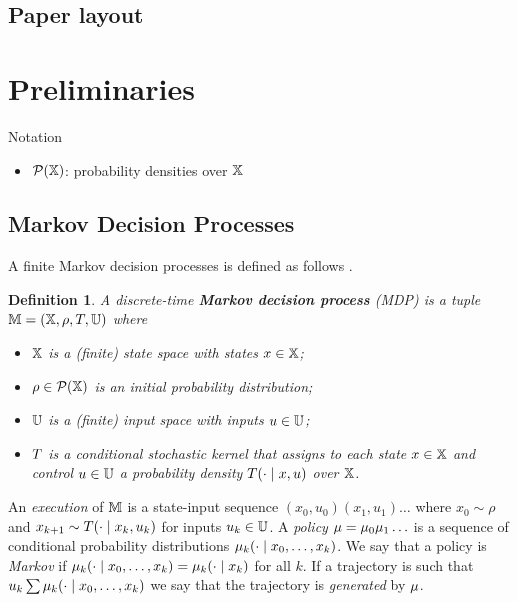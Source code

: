 \documentclass[conference]{IEEEtran}
\newtheorem{definition}{Definition}
\begin{document}
\subsection{Paper layout}

\section{Preliminaries}

Notation

\begin{itemize}
  \item $\mathcal P(\mathbb{X})$: probability densities over $\mathbb{X}$
\end{itemize}

\subsection{Markov Decision Processes}

A finite Markov decision processes is defined as follows \cite{hll1996}.
\begin{definition}
\label{def:MDP}
  A discrete-time \textbf{Markov decision process} (MDP) is a tuple $\mathbb{M} = (\mathbb{X}, \rho, T, \mathbb{U})$ where
  \begin{itemize}
    \item $\mathbb{X}$ is a (finite) state space with states $x\in\mathbb{X}$; %
    \item $\rho \in \mathcal P(\mathbb{X})$ is an initial probability distribution;
    \item $\mathbb{U}$ is a (finite) input space with inputs $u\in\mathbb{U}$;
    \item $T$ is a conditional stochastic kernel that assigns to each state $x\in \mathbb{X}$ and control $u\in \mathbb{U}$ a probability density $T(\cdot\mid x,u)$ over $\mathbb{X}$.
  \end{itemize}
\end{definition}

An \emph{execution} of $\mathbb{M}$ is a state-input sequence $(x_0, u_0)(x_1, u_1)\ldots$ where $x_0 \sim \rho$ and $x_{k+1} \sim T(\cdot \mid x_k, u_k)$ for inputs $u_k \in \mathbb{U}$. A \emph{policy} $\mu = \mu_0 \mu_1 \ldots$ is a sequence of conditional probability distributions $\mu_k( \cdot \mid x_0, \ldots, x_{k})$. We say that a policy is \emph{Markov} if $\mu_k( \cdot \mid x_0, \ldots, x_{k}) = \mu_k( \cdot \mid x_{k})$ for all $k$. If a trajectory is such that $u_k \sum \mu_k ( \cdot \mid x_0, \ldots, x_{k})$ we say that the trajectory is \emph{generated} by $\mu$.
\end{document}

